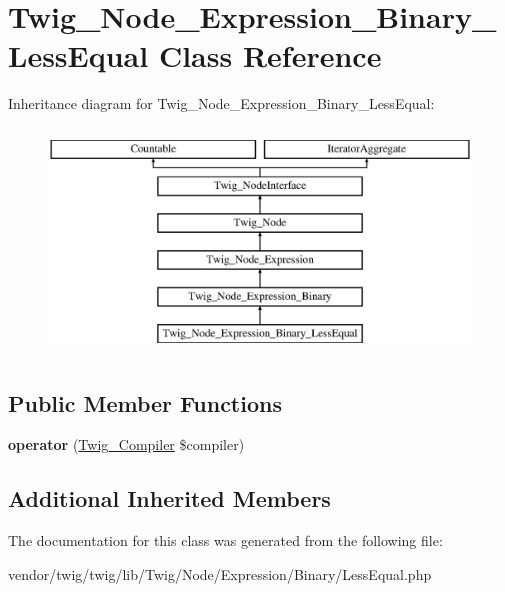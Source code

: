 \hypertarget{classTwig__Node__Expression__Binary__LessEqual}{}\section{Twig\+\_\+\+Node\+\_\+\+Expression\+\_\+\+Binary\+\_\+\+Less\+Equal Class Reference}
\label{classTwig__Node__Expression__Binary__LessEqual}
Inheritance diagram for Twig\+\_\+\+Node\+\_\+\+Expression\+\_\+\+Binary\+\_\+\+Less\+Equal\+:\begin{figure}[H]
\begin{center}
\leavevmode
\includegraphics[height=6.000000cm]{classTwig__Node__Expression__Binary__LessEqual}
\end{center}
\end{figure}
\subsection*{Public Member Functions}
\begin{DoxyCompactItemize}
\item 
{\bfseries operator} (\hyperlink{classTwig__Compiler}{Twig\+\_\+\+Compiler} \$compiler)\hypertarget{classTwig__Node__Expression__Binary__LessEqual_ad568c5ac06b46babca999eed95af792e}{}\label{classTwig__Node__Expression__Binary__LessEqual_ad568c5ac06b46babca999eed95af792e}

\end{DoxyCompactItemize}
\subsection*{Additional Inherited Members}


The documentation for this class was generated from the following file\+:\begin{DoxyCompactItemize}
\item 
vendor/twig/twig/lib/\+Twig/\+Node/\+Expression/\+Binary/Less\+Equal.\+php\end{DoxyCompactItemize}

